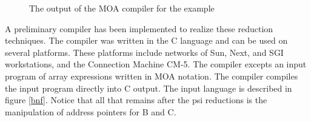 \begin{figure}[h]
\caption{The output of the MOA compiler for the example}
\label{ex_C}
\end{figure}
A preliminary compiler has been implemented to realize these reduction 
techniques.  The compiler was written in the C language and can be
used on several platforms.  These platforms include networks of Sun, Next,
and SGI workstations, and the Connection Machine CM-5.
The compiler excepts an input program of
array expressions written in MOA notation.  The compiler compiles the 
input program directly into C output.  The input language is described in
figure \ref{bnf}.  Notice that all that remains after the psi reductions is
the manipulation of address pointers for B and C.
 
